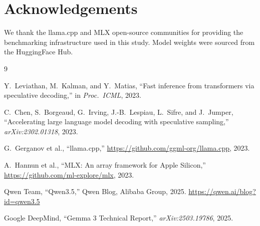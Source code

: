 \documentclass[11pt,a4paper]{article}
\begin{document}
\section*{Acknowledgements}

We thank the llama.cpp and MLX open-source communities for providing the
benchmarking infrastructure used in this study.
Model weights were sourced from the HuggingFace Hub.

\begin{thebibliography}{9}

Y.~Leviathan, M.~Kalman, and Y.~Matias,
``Fast inference from transformers via speculative decoding,''
in \textit{Proc.\ ICML}, 2023.

C.~Chen, S.~Borgeaud, G.~Irving, J.-B.~Lespiau, L.~Sifre, and J.~Jumper,
``Accelerating large language model decoding with speculative sampling,''
\textit{arXiv:2302.01318}, 2023.

G.~Gerganov et al., ``llama.cpp,''
\url{https://github.com/ggml-org/llama.cpp}, 2023.

A.~Hannun et al., ``MLX: An array framework for Apple Silicon,''
\url{https://github.com/ml-explore/mlx}, 2023.

Qwen Team, ``Qwen3.5,'' Qwen Blog, Alibaba Group, 2025.
\url{https://qwen.ai/blog?id=qwen3.5}

Google DeepMind, ``Gemma 3 Technical Report,''
\textit{arXiv:2503.19786}, 2025.

\end{thebibliography}
\end{document}
